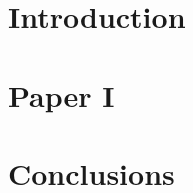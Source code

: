 \documentclass[12pt,twoside]{report}
\begin{document}
	

	
	
	
	
	
	\tableofcontents
	\setlength{\parskip}{18pt}
	\listoffigures
	\listoftables

	\clearpage

	\pagestyle{fancy}
	\fancyhead[LO,LE]{\nouppercase{\rightmark}}

\chapter{Introduction}
\label{chap:introduction}


\chapter{Paper I}
\label{chap:2}


\chapter{Conclusions}
\label{chap:conclusions}


\clearpage
\appendix
\label{chap:appendix}


\clearpage
{}


\end{document}
